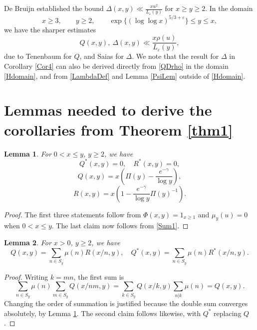 \documentclass[11pt]{amsart}
\newtheorem{lemma}{Lemma}
\begin{document}
De Bruijn \cite{BruI} established the bound $\Delta(x,y)\ll \frac{x u^2}{L_\varepsilon(y)}$ for $x\ge y\ge 2$. 
In the domain
\begin{equation}\label{Hdomain}
x\ge 3, \qquad y\ge 2, \qquad \exp\{ (\log\log x)^{5/3+\varepsilon}\} \le y \le x,
\end{equation}
we have the sharper estimates
\begin{equation}\label{QDrho}
Q(x,y), \ \Delta(x,y)\ll \frac{x \rho(u)}{L_\varepsilon(y)},
\end{equation}
due to Tenenbaum \cite[Thm III.6.10 \& Eq III.6.61]{Ten} for $Q$, and Saias \cite{Saias} for $\Delta$.
We note that the result for $\Delta$ in Corollary \ref{Cor4} can also be derived directly from \eqref{QDrho} 
in the domain \eqref{Hdomain}, and from \eqref{LambdaDef} and Lemma \ref{PsiLem} outside of \eqref{Hdomain}.






\section{Lemmas needed to derive the corollaries from Theorem \ref{thm1}}\label{SecLemmas}



\begin{lemma}\label{Lem0}
For $0< x \le y$, $y\ge 2$, we have
$$
Q^*(x,y)=0, \quad R^*(x,y)=0,
$$
$$
Q(x,y) = x\left( \Pi(y) - \frac{e^{-\gamma}}{\log y} \right), 
$$
$$
R(x,y) =  x\left( 1 - \frac{e^{-\gamma}}{\log y}\Pi(y)^{-1} \right) .
$$
\end{lemma}
\begin{proof}
The first three statements follow from $\Phi(x,y)=1_{x\ge 1} $ and $\mu_y(u)=0$ when $0<x\le y$.
The last claim now follows from  \eqref{Sum1}. 
\end{proof}

\begin{lemma}\label{LemMobInv}
For $x> 0$, $y\ge 2$, we have
\begin{equation*}
Q(x,y)= \sum_{n\in S_y} \mu(n) R(x/n,y), \quad Q^*(x,y)= \sum_{n\in S_y} \mu(n) R^*(x/n,y).
\end{equation*}
\end{lemma}
\begin{proof}
Writing $k=mn$, the first sum is
$$
\sum_{n\in S_y} \mu(n)\sum_{m\in S_y} Q(x/nm,y)
=\sum_{k\in S_y}  Q(x/k,y) \sum_{n|k} \mu(n) = Q(x,y).
$$
Changing the order of summation is justified because the double sum converges absolutely, by Lemma \ref{Lem0}.
The second claim follows likewise, with $Q^*$ replacing $Q$. 
\end{proof}
\end{document}
